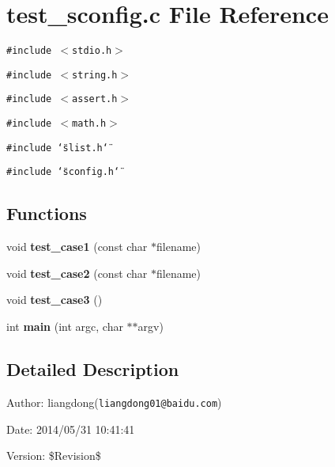 \section{test\_\-sconfig.c File Reference}
\label{test__sconfig_8c}
{\tt \#include $<$stdio.h$>$}\par
{\tt \#include $<$string.h$>$}\par
{\tt \#include $<$assert.h$>$}\par
{\tt \#include $<$math.h$>$}\par
{\tt \#include \char`\"{}slist.h\char`\"{}}\par
{\tt \#include \char`\"{}sconfig.h\char`\"{}}\par
\subsection*{Functions}
\begin{CompactItemize}
\item 
void {\bf test\_\-case1} (const char $\ast$filename)\label{test__sconfig_8c_a0}

\item 
void {\bf test\_\-case2} (const char $\ast$filename)\label{test__sconfig_8c_a1}

\item 
void {\bf test\_\-case3} ()\label{test__sconfig_8c_a2}

\item 
int {\bf main} (int argc, char $\ast$$\ast$argv)\label{test__sconfig_8c_a3}

\end{CompactItemize}


\subsection{Detailed Description}
\begin{Desc}
\item[Author:]liangdong({\tt liangdong01@baidu.com}) \end{Desc}
\begin{Desc}
\item[Date:]2014/05/31 10:41:41 \end{Desc}
\begin{Desc}
\item[Version:]\$Revision\$ \end{Desc}
